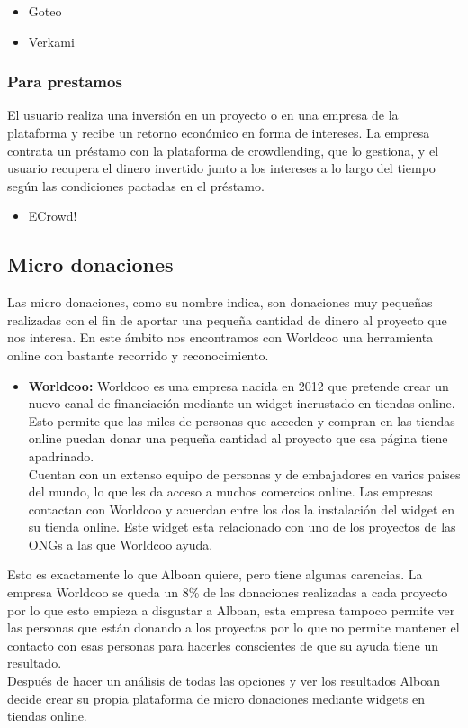 \begin{itemize}
	\item Goteo
	\item Verkami
\end{itemize}
		
\subsubsection{Para prestamos}
El usuario realiza una inversión en un proyecto o en una empresa de la plataforma y recibe un retorno económico en forma de intereses. La empresa contrata un préstamo con la plataforma de crowdlending, que lo gestiona, y el usuario recupera el dinero invertido junto a los intereses a lo largo del tiempo según las condiciones pactadas en el préstamo.
		
\begin{itemize}
	\item ECrowd!
\end{itemize}
			
\subsection{Micro donaciones}
Las micro donaciones, como su nombre indica, son donaciones muy pequeñas realizadas con el fin de aportar una pequeña cantidad de dinero al proyecto que nos interesa. En este ámbito nos encontramos con Worldcoo\cite{worldcoo} una herramienta online con bastante recorrido y reconocimiento.
			
\begin{itemize}
	\item \textbf{Worldcoo:} \smallbreak
	Worldcoo es una empresa nacida en 2012 que pretende crear un nuevo canal de financiación mediante un widget incrustado en tiendas online. Esto permite que las miles de personas que acceden y compran en las tiendas online puedan donar una pequeña cantidad al proyecto que esa página tiene apadrinado.\\
	
	Cuentan con un extenso equipo de personas y de embajadores en varios paises del mundo, lo que les da acceso a muchos comercios online. Las empresas contactan con Worldcoo y acuerdan entre los dos la instalación del widget en su tienda online. Este widget esta relacionado con uno de los proyectos de las ONGs a las que Worldcoo ayuda.
\end{itemize}
				
Esto es exactamente lo que Alboan quiere, pero tiene algunas carencias. La empresa Worldcoo se queda un 8\% de las donaciones realizadas a cada proyecto por lo que esto empieza a disgustar a Alboan, esta empresa tampoco permite ver las personas que están donando a los proyectos por lo que no permite mantener el contacto con esas personas para hacerles conscientes de que su ayuda tiene un resultado. \\

Después de hacer un análisis de todas las opciones y ver los resultados Alboan decide crear su propia plataforma de micro donaciones mediante widgets en tiendas online.